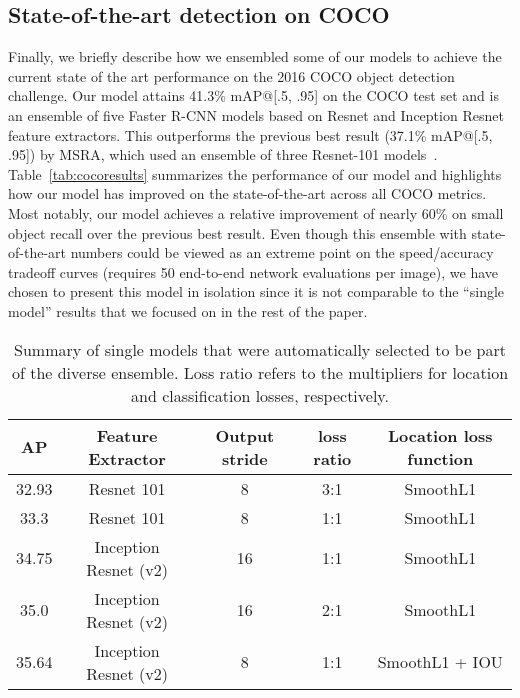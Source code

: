 \documentclass[10pt,twocolumn,letterpaper]{article}
\begin{document}
\subsection{State-of-the-art detection on COCO}

Finally, we briefly describe how we ensembled some of our models to
achieve the current state of the art performance on the 2016 COCO
object detection challenge.  Our model attains 41.3\% mAP@[.5, .95] on
the COCO test set and is an ensemble of five Faster R-CNN models based
on Resnet and Inception Resnet feature extractors.
This outperforms the
previous best result (37.1\% mAP@[.5, .95]) by MSRA, which used an
ensemble of three  
Resnet-101 models~\cite{he2015deep}.
Table~\ref{tab:cocoresults} summarizes the performance of our model
and highlights how our model has improved on the state-of-the-art
across all COCO metrics.  Most notably, our model achieves a relative
improvement of nearly 60\% on small object recall over the previous
best result. 
Even though this ensemble with state-of-the-art numbers could be
viewed as an extreme point on the speed/accuracy tradeoff curves
(requires 50 end-to-end network evaluations per image), we have
chosen to present this model in isolation since it is not comparable
to the ``single model'' results that we focused on in the rest of the paper.


\begin{table*}[t!]
\begin{center}
{\footnotesize
\begin{tabular}{c|c|c|c|c}
AP & Feature Extractor & Output stride & loss ratio & Location loss function \\
\hline
32.93 & Resnet 101 & 8 & 3:1 & SmoothL1 \\
33.3 & Resnet 101 & 8 & 1:1 & SmoothL1 \\
34.75 & Inception Resnet (v2) & 16 & 1:1 & SmoothL1 \\
35.0 & Inception Resnet (v2) & 16 & 2:1 & SmoothL1 \\
35.64 & Inception Resnet (v2) & 8 & 1:1 & SmoothL1 +  IOU 
\end{tabular}
}
\end{center}
\caption{
\footnotesize 
Summary of single models that were automatically selected to be part
of the diverse ensemble.
Loss ratio refers to the multipliers
 for location and classification losses, respectively.
}
\label{tab:models_for_ensemble}
\end{table*}
\end{document}
